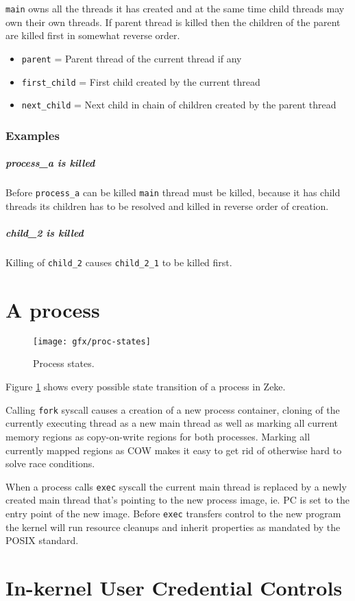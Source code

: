 \verb+main+ owns all the threads it has created and at the same time child
threads may own their own threads. If parent thread is killed then the
children of the parent are killed first in somewhat reverse order.

\begin{itemize}
  \item \verb+parent+ = Parent thread of the current thread if any
  \item \verb+first_child+ = First child created by the current thread
  \item \verb+next_child+ = Next child in chain of children created by the
        parent thread
\end{itemize}

\subsubsection{Examples}

\subparagraph*{process\_a is killed}

Before \verb+process_a+ can be killed \verb+main+ thread must be killed,
because it has child threads its children has to be resolved and killed in
reverse order of creation.

\subparagraph*{child\_2 is killed}

Killing of \verb+child_2+ causes \verb+child_2_1+ to be killed first.

\section{A process}

\begin{figure}
  \center
  \texttt{[image: gfx/proc-states]}
  \caption{Process states.}
  \label{figure:procstates}
\end{figure}


Figure \ref{figure:procstates} shows every possible state transition of a
process in Zeke.

Calling \verb+fork+ syscall causes a creation of a new process container,
cloning of the currently executing thread as a new main thread as well as
marking all current memory regions as copy-on-write regions for both processes.
Marking all currently mapped regions as COW makes it easy to get rid of
otherwise hard to solve race conditions.

When a process calls \verb+exec+ syscall the current main thread is replaced by
a newly created main thread that's pointing to the new process image, ie.
\acs{PC} is set to the entry point of the new image. Before \verb+exec+
transfers control to the new program the kernel will run resource cleanups and
inherit properties as mandated by the \acs{POSIX} standard.

\section{In-kernel User Credential Controls}
